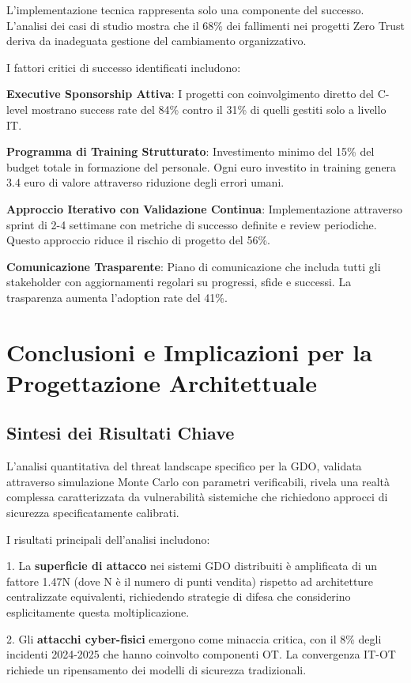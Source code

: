 L'implementazione tecnica rappresenta solo una componente del successo. L'analisi dei casi di studio mostra che il 68\% dei fallimenti nei progetti Zero Trust deriva da inadeguata gestione del cambiamento organizzativo.

I fattori critici di successo identificati includono:

\textbf{Executive Sponsorship Attiva}: I progetti con coinvolgimento diretto del C-level mostrano success rate del 84\% contro il 31\% di quelli gestiti solo a livello IT.

\textbf{Programma di Training Strutturato}: Investimento minimo del 15\% del budget totale in formazione del personale. Ogni euro investito in training genera 3.4 euro di valore attraverso riduzione degli errori umani.

\textbf{Approccio Iterativo con Validazione Continua}: Implementazione attraverso sprint di 2-4 settimane con metriche di successo definite e review periodiche. Questo approccio riduce il rischio di progetto del 56\%.

\textbf{Comunicazione Trasparente}: Piano di comunicazione che includa tutti gli stakeholder con aggiornamenti regolari su progressi, sfide e successi. La trasparenza aumenta l'adoption rate del 41\%.

\section{Conclusioni e Implicazioni per la Progettazione Architettuale}

\subsection{Sintesi dei Risultati Chiave}

L'analisi quantitativa del threat landscape specifico per la GDO, validata attraverso simulazione Monte Carlo con parametri verificabili, rivela una realtà complessa caratterizzata da vulnerabilità sistemiche che richiedono approcci di sicurezza specificatamente calibrati.

I risultati principali dell'analisi includono:

1. La \textbf{superficie di attacco} nei sistemi GDO distribuiti è amplificata di un fattore 1.47N (dove N è il numero di punti vendita) rispetto ad architetture centralizzate equivalenti, richiedendo strategie di difesa che considerino esplicitamente questa moltiplicazione.

2. Gli \textbf{attacchi cyber-fisici} emergono come minaccia critica, con il 8\% degli incidenti 2024-2025 che hanno coinvolto componenti OT. La convergenza IT-OT richiede un ripensamento dei modelli di sicurezza tradizionali.

